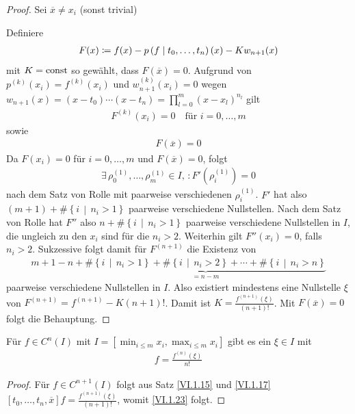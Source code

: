 \begin{proof}
  Sei $\overline{x}\neq x_i$ (sonst trivial)
  \label{im6.1.18}


  Definiere
  \begin{gather}
    F(x) \coloneqq f(x)-p\left( f \mid t_0,\dotsc,t_n \right)(x) - Kw_{n+1}(x)
    \label{VI.1.22}
  \end{gather}
  mit $K=\operatorname{const}$ so gewählt, dass $F(\overline{x})=0$.
  Aufgrund von $p^{(k)}(x_i)=f^{(k)}(x_i)$
  und $w_{n+1}^{(k)}(x_i) = 0$ wegen
  $w_{n+1}(x) =
  (x-t_0)\dotsm(x-t_n)=\prod_{l=0}^{m}(x-x_l)^{n_l}$
  gilt
  \begin{gather*}
    F^{(k)}(x_i) = 0 
    \quad \text{für } i=0,\dotsc,m 
  \end{gather*}
  sowie
  \begin{gather*}
    F(\overline{x})=0
  \end{gather*}
  Da $F(x_i)=0$ für $i=0,\dotsc,m$ und $F(\overline{x})=0$, folgt
  \begin{gather*}
    \exists\, \rho_0^{(1)},\dotsc,\rho_m^{(1)}\in I,\,
    : F'(\rho_i^{(1)})=0
  \end{gather*}
  nach dem Satz von Rolle 
  mit paarweise verschiedenen $\rho_i^{(1)}$.
  $F'$ hat also $(m+1)+\#\left\{i\,\middle\vert\, n_i>1\right\}$
  paarweise verschiedene Nullstellen.
  Nach dem Satz von Rolle hat $F''$ also 
  $n+\#\left\{i\,\middle\vert\, n_i>1\right\}$
  paarweise verschiedene Nullstellen in $I$,
  die ungleich zu den $x_i$ sind für die $n_i>2$.
  Weiterhin gilt $F''(x_i)=0$, falls $n_i>2$.
  Sukzessive folgt damit für $F^{(n+1)}$ die Existenz von
  \begin{gather*}
    m+1-n + \underbrace{
      \#\left\{i\,\middle\vert\, n_i>1\right\}
      + \#\left\{i\,\middle\vert\, n_i>2\right\}
      + \dotsb 
      + \#\left\{i\,\middle\vert\, n_i>n\right\}
    }_{=n-m}
  \end{gather*}
  paarweise verschiedene Nullstellen in $I$.
  Also existiert mindestens eine Nullstelle $\xi$ von
  $F^{(n+1)}=f^{(n+1)}-K(n+1)!$. Damit ist
  $K=\frac{f^{(n+1)}(\xi)}{(n+1)!}$.
  Mit $F(\overline{x}) =0$ folgt die Behauptung.
\end{proof}


\begin{Fole}
  Für $f\in C^n(I) $ mit $I=[\min_{i\leq m}x_i, \max_{i\leq m}x_i]$
  gibt es ein $\xi\in I$ mit 
  \begin{gather}
    [t_0,\dotsc,t_n]f=\frac{f^{(n)}(\xi)}{n!}
    \label{VI.1.23}
  \end{gather}

  \begin{proof}
    Für $f\in C^{n+1}(I)$ folgt aus
    Satz \ref{VI.1.15} und \eqref{VI.1.17}
    $[t_0,\dotsc,t_n,\overline{x}]f= \frac{f^{(n+1)}(\xi)}{(n+1)!}$,
    womit \eqref{VI.1.23} folgt.
  \end{proof}
\end{Fole}

